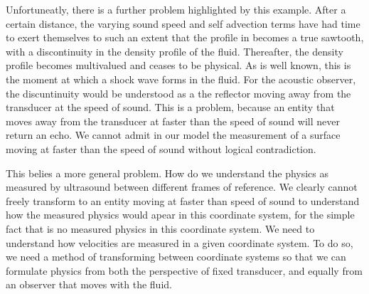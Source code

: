 Unfortuneatly, there is a further problem highlighted by this example.
After a certain distance,
the varying sound speed and self advection terms have had time to exert themselves to such an extent that the profile in
 becomes a true sawtooth, with a discontinuity in the density profile of the fluid.
Thereafter, the density profile becomes multivalued and ceases to be physical.
As is well known,
this is the moment at which a shock wave forms in the fluid.
For the acoustic observer, the discuntinuity would be understood as a the reflector moving away from the transducer at the speed of sound.
%
This is a problem, because an entity that moves away from the transducer at faster than the speed of sound will never return an echo.
We cannot admit in our model the measurement of a surface moving at faster than the speed of sound
without logical contradiction.

This belies a more general problem.
How do we understand the physics as measured by ultrasound between different frames of reference.
We clearly cannot freely transform to an entity moving at faster than speed of sound
to understand how the measured physics would apear in this coordinate system,
for the simple fact that is no measured physics in this coordinate system.
We need to understand how velocities are measured in a given coordinate system.
To do so, we need a method of transforming between coordinate systems so that we can formulate physics from both the perspective of
fixed transducer, and equally from an observer that moves with the fluid.










